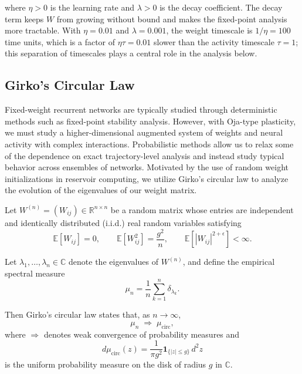 \documentclass[paper=a4, fontsize=11pt]{scrartcl} %
\numberwithin{equation}{section} %
\numberwithin{figure}{section} %
\numberwithin{table}{section} %
\begin{document}
where $\eta > 0$ is the learning rate and $\lambda > 0$ is the decay coefficient.
The decay term keeps $W$ from growing without bound and makes the fixed-point
analysis more tractable.  With $\eta = 0.01$ and $\lambda = 0.001$, the weight
timescale is $1/\eta = 100$ time units, which is a factor of $\eta\tau = 0.01$
slower than the activity timescale $\tau = 1$; this separation of timescales
plays a central role in the analysis below.

\subsection{Girko's Circular Law}

Fixed-weight recurrent networks are typically studied through deterministic methods
such as fixed-point stability analysis. However, with Oja-type plasticity, we must
study a higher-dimensional augmented system of weights and neural activity with
complex interactions. Probabilistic methods allow us to relax some of the dependence
on exact trajectory-level analysis and instead study typical behavior across ensembles
of networks. Motivated by the use of random weight initializations in reservoir
computing, we utilize Girko's circular law to analyze the evolution of the eigenvalues
of our weight matrix.

Let $W^{(n)} = (W_{ij}) \in \mathbb{R}^{n \times n}$ be a random matrix whose entries
are independent and identically distributed (i.i.d.) real random variables satisfying
\begin{equation}
    \mathbb{E}[W_{ij}] = 0,
    \qquad
    \mathbb{E}[W_{ij}^2] = \frac{g^2}{n},
    \qquad
    \mathbb{E}[|W_{ij}|^{2+\epsilon}] < \infty.
\end{equation}

Let $\lambda_1,\dots,\lambda_n \in \mathbb{C}$ denote the eigenvalues of $W^{(n)}$,
and define the empirical spectral measure
\begin{equation}
    \mu_n = \frac{1}{n}\sum_{k=1}^n \delta_{\lambda_k}.
\end{equation}

Then Girko's circular law states that, as $n \to \infty$,
\begin{equation}
    \mu_n \;\Rightarrow\; \mu_{\mathrm{circ}},
\end{equation}
where $\Rightarrow$ denotes weak convergence of probability measures and
\begin{equation}
    d\mu_{\mathrm{circ}}(z) = \frac{1}{\pi g^2}\mathbf{1}_{\{|z|\le g\}}\, d^2 z
\end{equation}
is the uniform probability measure on the disk of radius $g$ in $\mathbb{C}$.
\end{document}
